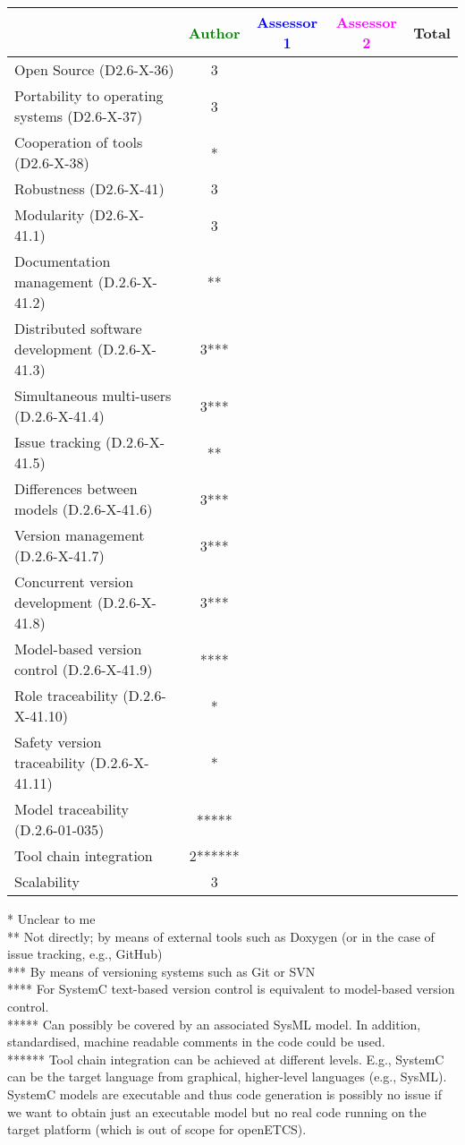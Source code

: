 \begin{tabular}{|l | c | c | c | c|}
\hline
& \textcolor{green}{Author} & \textcolor{blue}{Assessor 1} & \textcolor{magenta}{Assessor 2} & Total \\
\hline 
Open Source (D2.6-X-36) &3 & & &  \\
\hline 
Portability to operating systems (D2.6-X-37) &3 & & &  \\
\hline
Cooperation of tools (D2.6-X-38) &* & & &  \\
\hline
Robustness (D2.6-X-41) &3 & & & \\
\hline
Modularity (D2.6-X-41.1) &3 & & & \\
\hline
Documentation management (D.2.6-X-41.2) &** & & & \\
\hline
Distributed software development (D.2.6-X-41.3)  &3*** & & & \\
\hline
Simultaneous multi-users (D.2.6-X-41.4)   &3*** & & & \\
\hline
Issue tracking (D.2.6-X-41.5) &** & & & \\
\hline
Differences between models (D.2.6-X-41.6) &3*** & & & \\
\hline
Version management (D.2.6-X-41.7) &3*** & & & \\
\hline
Concurrent version development (D.2.6-X-41.8) &3*** & & & \\
\hline
Model-based version control (D.2.6-X-41.9) &**** & & & \\
\hline
Role traceability (D.2.6-X-41.10) &* & & & \\
\hline
Safety version traceability (D.2.6-X-41.11) &* & & & \\
\hline
Model traceability (D.2.6-01-035) &***** & & & \\
\hline
Tool chain integration &2****** & & & \\
\hline
Scalability &3 & & & \\
\hline
\end{tabular}

\begin{author_comment}
  * Unclear to me\\
  ** Not directly; by means of external tools such as Doxygen (or in the case of issue tracking, e.g., GitHub)\\
 *** By means of versioning systems such as Git or SVN\\
**** For SystemC text-based version control is equivalent to model-based version control.\\
***** Can possibly be covered by an associated SysML model. In addition, standardised, machine readable comments in the code could be used.\\
****** Tool chain integration can be achieved at different levels. E.g., SystemC can be the target language from graphical, higher-level languages (e.g., SysML). SystemC models are executable and thus code generation is possibly no issue if we want to obtain just an executable model but no real code running on the target platform (which is out of scope for openETCS).
\end{author_comment}

